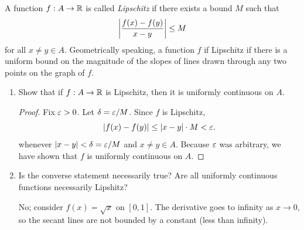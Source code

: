 \begin{problem}
  A function $f : A \to \mathbb{R}$ is called \textit{Lipschitz} if there exists a bound $M$ such that
  \[
    \left\lvert  \frac{f(x)-f(y)}{x-y}  \right\rvert \leq M
  \]
  for all $x \neq y \in A$. Geometrically speaking, a function $f$ if Lipschitz
  if there is a uniform bound on the magnitude of the slopes of lines drawn
  through any two points on the graph of $f$.

  \begin{enumerate}[label=(\alph*)]
    \item Show that if $f : A \to \mathbb{R}$ is Lipschitz, then it is uniformly continuous on $A$.

      \begin{proof}
        Fix $\varepsilon > 0$. Let $\delta = \varepsilon/M$. Since $f$ is Lipschitz,
        \[
          \left\lvert f(x) - f(y) \right\rvert \leq \left\lvert x - y \right\rvert \cdot M < \varepsilon.
        \]
        whenever $\left\lvert x - y \right\rvert < \delta = \varepsilon/M$ and $x \neq y \in A$.
        Because $\varepsilon$ was arbitrary, we have shown that $f$ is uniformly continuous on $A$.
      \end{proof}

    \item Is the converse statement necessarily true? Are all uniformly continuous functions necessarily Lipshitz?

      No; consider $f(x) = \sqrt{x}$ on $[0, 1]$. The derivative goes to infinity as $x \to 0$, so the secant lines
      are not bounded by a constant (less than infinity).
  \end{enumerate}

\end{problem}

